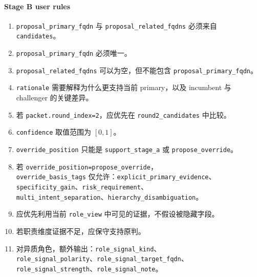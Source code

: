 \documentclass[11pt,a4paper]{ctexart}
\begin{document}
\paragraph{Stage B user rules}
\begin{enumerate}[leftmargin=1.6em]
\item \texttt{proposal\_primary\_fqdn} 与 \texttt{proposal\_related\_fqdns} 必须来自 \texttt{candidates}。
\item \texttt{proposal\_primary\_fqdn} 必须唯一。
\item \texttt{proposal\_related\_fqdns} 可以为空，但不能包含 \texttt{proposal\_primary\_fqdn}。
\item \texttt{rationale} 需要解释为什么更支持当前 primary，以及 incumbent 与 challenger 的关键差异。
\item 若 \texttt{packet.round\_index=2}，应优先在 \texttt{round2\_candidates} 中比较。
\item \texttt{confidence} 取值范围为 $[0,1]$。
\item \texttt{override\_position} 只能是 \texttt{support\_stage\_a} 或 \texttt{propose\_override}。
\item 若 \texttt{override\_position=propose\_override}，\\
\texttt{override\_basis\_tags} 仅允许：\texttt{explicit\_primary\_evidence}、\\
\texttt{specificity\_gain}、\texttt{risk\_requirement}、\\
\texttt{multi\_intent\_separation}、\texttt{hierarchy\_disambiguation}。
\item 应优先利用当前 \texttt{role\_view} 中可见的证据，不假设被隐藏字段。
\item 若职责维度证据不足，应保守支持原判。
\item 对异质角色，额外输出：\texttt{role\_signal\_kind}、\\
\texttt{role\_signal\_polarity}、\texttt{role\_signal\_target\_fqdn}、\\
\texttt{role\_signal\_strength}、\texttt{role\_signal\_note}。
\end{enumerate}
\end{document}
